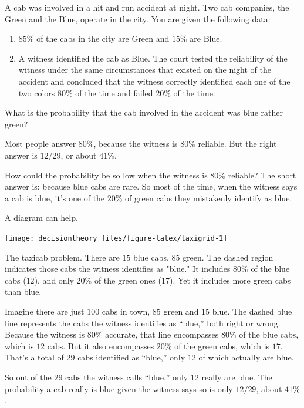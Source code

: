 \documentclass[]{tufte-book}
\providecommand{\tightlist}{%
  \setlength{\itemsep}{0pt}\setlength{\parskip}{0pt}}
\begin{document}
A cab was involved in a hit and run accident at night. Two cab companies, the Green and the Blue, operate in the city. You are given the following data:

\begin{enumerate}
\def\labelenumi{\arabic{enumi}.}
\tightlist
\item
  \(85\%\) of the cabs in the city are Green and \(15\%\) are Blue.
\item
  A witness identified the cab as Blue. The court tested the reliability of the witness under the same circumstances that existed on the night of the accident and concluded that the witness correctly identified each one of the two colors \(80\%\) of the time and failed \(20\%\) of the time.
\end{enumerate}

What is the probability that the cab involved in the accident was blue rather green?

Most people answer \(80\%\), because the witness is \(80\%\) reliable. But the right answer is \(12/29\), or about \(41\%\).

How could the probability be so low when the witness is \(80\%\) reliable? The short answer is: because blue cabs are rare. So most of the time, when the witness says a cab is blue, it's one of the \(20\%\) of green cabs they mistakenly identify as blue.

A diagram can help.

\begin{marginfigure}
\texttt{[image: decisiontheory\_files/figure-latex/taxigrid-1]} \caption[The taxicab problem]{The taxicab problem. There are $15$ blue cabs, $85$ green. The dashed region indicates those cabs the witness identifies as "blue." It includes $80\%$ of the blue cabs ($12$), and only $20\%$ of the green ones ($17$). Yet it includes more green cabs than blue.}\label{fig:taxigrid}
\end{marginfigure}

Imagine there are just \(100\) cabs in town, \(85\) green and \(15\) blue. The dashed blue line represents the cabs the witness identifies as
``blue,'' both right or wrong. Because the witness is \(80\%\) accurate, that line encompasses \(80\%\) of the blue cabs, which is \(12\) cabs. But it also encompasses \(20\%\) of the green cabs, which is \(17\). That's a total of \(29\) cabs identified as ``blue,'' only \(12\) of which actually are blue.

So out of the \(29\) cabs the witness calls ``blue,'' only \(12\) really are blue. The probability a cab really is blue given the witness says so is only \(12/29\), about \(41\%\).
\end{document}
